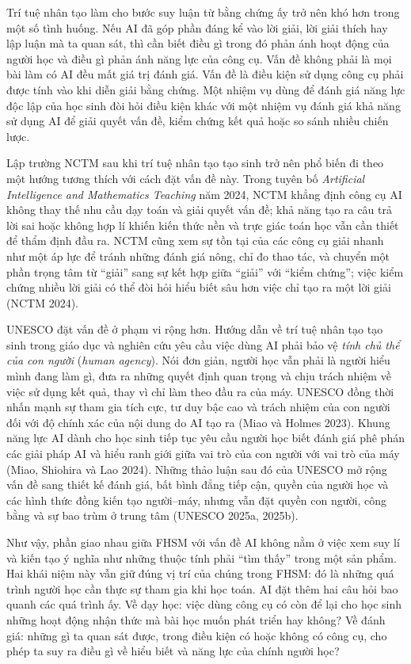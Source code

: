 Trí tuệ nhân tạo làm cho bước suy luận từ bằng chứng ấy trở nên khó hơn trong một số tình huống. Nếu AI đã góp phần đáng kể vào lời giải, lời giải thích hay lập luận mà ta quan sát, thì cần biết điều gì trong đó phản ánh hoạt động của người học và điều gì phản ánh năng lực của công cụ. Vấn đề không phải là mọi bài làm có AI đều mất giá trị đánh giá. Vấn đề là điều kiện sử dụng công cụ phải được tính vào khi diễn giải bằng chứng. Một nhiệm vụ dùng để đánh giá năng lực độc lập của học sinh đòi hỏi điều kiện khác với một nhiệm vụ đánh giá khả năng sử dụng AI để giải quyết vấn đề, kiểm chứng kết quả hoặc so sánh nhiều chiến lược.

Lập trường NCTM sau khi trí tuệ nhân tạo tạo sinh trở nên phổ biến đi theo một hướng tương thích với cách đặt vấn đề này. Trong tuyên bố \emph{Artificial Intelligence and Mathematics Teaching} năm 2024, NCTM khẳng định công cụ AI không thay thế nhu cầu dạy toán và giải quyết vấn đề; khả năng tạo ra câu trả lời sai hoặc không hợp lí khiến kiến thức nền và trực giác toán học vẫn cần thiết để thẩm định đầu ra. NCTM cũng xem sự tồn tại của các công cụ giải nhanh như một áp lực để tránh những đánh giá nông, chỉ đo thao tác, và chuyển một phần trọng tâm từ ``giải'' sang sự kết hợp giữa ``giải'' với ``kiểm chứng''; việc kiểm chứng nhiều lời giải có thể đòi hỏi hiểu biết sâu hơn việc chỉ tạo ra một lời giải (NCTM 2024).

UNESCO đặt vấn đề ở phạm vi rộng hơn. Hướng dẫn về trí tuệ nhân tạo tạo sinh trong giáo dục và nghiên cứu yêu cầu việc dùng AI phải bảo vệ \emph{tính chủ thể của con người} (\emph{human agency}). Nói đơn giản, người học vẫn phải là người hiểu mình đang làm gì, đưa ra những quyết định quan trọng và chịu trách nhiệm về việc sử dụng kết quả, thay vì chỉ làm theo đầu ra của máy. UNESCO đồng thời nhấn mạnh sự tham gia tích cực, tư duy bậc cao và trách nhiệm của con người đối với độ chính xác của nội dung do AI tạo ra (Miao và Holmes 2023). Khung năng lực AI dành cho học sinh tiếp tục yêu cầu người học biết đánh giá phê phán các giải pháp AI và hiểu ranh giới giữa vai trò của con người với vai trò của máy (Miao, Shiohira và Lao 2024). Những thảo luận sau đó của UNESCO mở rộng vấn đề sang thiết kế đánh giá, bất bình đẳng tiếp cận, quyền của người học và các hình thức đồng kiến tạo người--máy, nhưng vẫn đặt quyền con người, công bằng và sự bao trùm ở trung tâm (UNESCO 2025a, 2025b).

Như vậy, phần giao nhau giữa FHSM với vấn đề AI không nằm ở việc xem suy lí và kiến tạo ý nghĩa như những thuộc tính phải ``tìm thấy'' trong một sản phẩm. Hai khái niệm này vẫn giữ đúng vị trí của chúng trong FHSM: đó là những quá trình người học cần thực sự tham gia khi học toán. AI đặt thêm hai câu hỏi bao quanh các quá trình ấy. Về dạy học: việc dùng công cụ có còn để lại cho học sinh những hoạt động nhận thức mà bài học muốn phát triển hay không? Về đánh giá: những gì ta quan sát được, trong điều kiện có hoặc không có công cụ, cho phép ta suy ra điều gì về hiểu biết và năng lực của chính người học?

